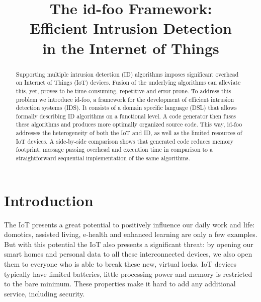 \documentclass[conference]{IEEEtran}
\newcommand{\NAME}{id-foo\xspace}
\begin{document}
\expandafter\def\csname PY@tok@err\endcsname{}

\title{
The \NAME Framework:\\
Efficient Intrusion Detection\\
in the Internet of Things
}

\author{%
}

\maketitle

\begin{abstract}

Supporting multiple intrusion detection (ID) algorithms imposes significant
overhead on Internet of Things (IoT) devices. Fusion of the underlying
algorithms can alleviate this, yet, proves to be time-consuming, repetitive and
error-prone. To address this problem we introduce \NAME, a framework for the
development of efficient intrusion detection systems (IDS). It consists of a
domain specific language (DSL) that allows formally describing ID algorithms on
a functional level. A code generator then fuses these algorithms and produces
more optimally organized source code. This way, \NAME addresses the
heterogeneity of both the IoT and ID, as well as the limited resources of IoT
devices. A side-by-side comparison shows that generated code reduces memory
footprint, message passing overhead and execution time in comparison to a
straightforward sequential implementation of the same algorithms.

\end{abstract}

\section{Introduction}



The IoT presents a great potential to positively influence our daily work and
life: domotics, assisted living, e-health and enhanced learning are only a few
examples\cite{atzori2010internet}. But with this potential the IoT also
presents a significant threat: by opening our smart homes
\cite{aldrich2003smart} and personal data\cite{weber2010internet} to all these
interconnected devices, we also open them to everyone who is able to break
these new, virtual locks. IoT devices typically have limited batteries, little
processing power and memory is restricted to the bare minimum. These properties
make it hard to add any additional service, including security.
\end{document}

